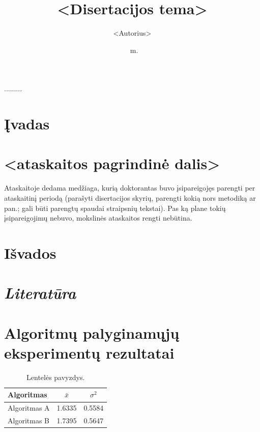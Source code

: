 \documentclass[11pt, a4paper, lithuanian]{article}
\date{\the\year\ m.\monthlt[\month]}
\title{<Disertacijos tema>}
\author{<Autorius>}
\begin{document}
\maketitle

.........


\tableofcontents

\section{Įvadas}

\section{<ataskaitos pagrindinė dalis>}
Ataskaitoje dedama medžiaga, kurią doktorantas buvo įsipareigojęs parengti per
ataskaitinį periodą (parašyti disertacijos skyrių, parengti kokią nors metodiką
ar pan.; gali būti parengtų spaudai straipsnių tekstai). Pas ką plane tokių
įsipareigojimų nebuvo, mokslinės ataskaitos rengti nebūtina.

\section{Išvados}

\section*{\emph{Literatūra}}%
%    

\appendix
\section{Algoritmų palyginamųjų eksperimentų rezultatai}
\begin{table}[H]
  \centering
  \caption{Lentelės pavyzdys.}
  {\begin{tabular}{|l|c|c|} \hline
    Algoritmas    & $\bar{x}$ & $\sigma^{2}$ \\
    \hline
    Algoritmas A  & 1.6335    & 0.5584       \\
    Algoritmas B  & 1.7395    & 0.5647       \\
    \hline
  \end{tabular}}
  \label{tab:table example}
\end{table}
\end{document}
